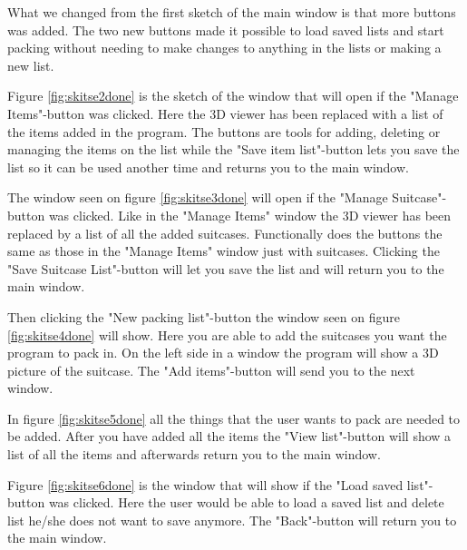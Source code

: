 What we changed from the first sketch of the main window is that more buttons was added. The two new buttons made it possible to load saved lists and start packing without needing to make changes to anything in the lists or making a new list.


Figure \ref{fig:skitse2done} is the sketch of the window that will open if the "Manage Items"-button was clicked. Here the 3D viewer has been replaced with a list of the items added in the program. The buttons are tools for adding, deleting or managing the items on the list while the "Save item list"-button lets you save the list so it can be used another time and returns you to the main window.


The window seen on figure \ref{fig:skitse3done} will open if the "Manage Suitcase"-button was clicked. Like in the "Manage Items" window the 3D viewer has been replaced by a list of all the added suitcases. Functionally does the buttons the same as those in the "Manage Items" window just with suitcases. Clicking the "Save Suitcase List"-button will let you save the list and will return you to the main window.


Then clicking the "New packing list"-button the window seen on figure \ref{fig:skitse4done} will show. Here you are able to add the suitcases you want the program to pack in. On the left side in a window the program will show a 3D picture of the suitcase. The "Add items"-button will send you to the next window.


In figure \ref{fig:skitse5done} all the things that the user wants to pack are needed to be added. After you have added all the items the "View list"-button will show a list of all the items and afterwards return you to the main window.


Figure \ref{fig:skitse6done} is the window that will show if the "Load saved list"-button was clicked. Here the user would be able to load a saved list and delete list he/she does not want to save anymore. The "Back"-button will return you to the main window.

